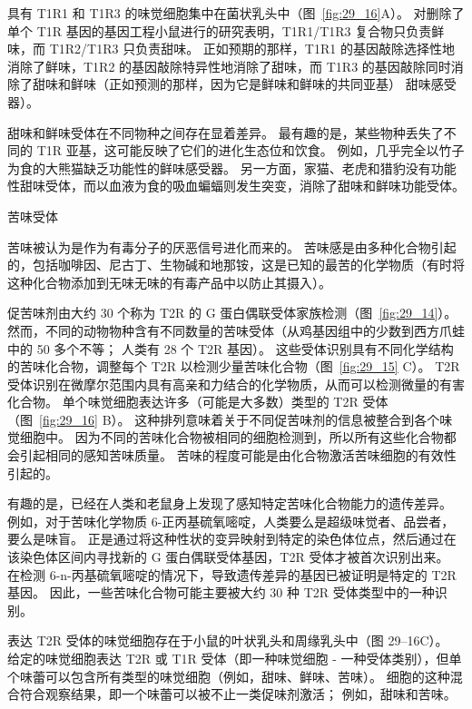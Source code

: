 具有 T1R1 和 T1R3 的味觉细胞集中在菌状乳头中（图~\ref{fig:29_16}A）。
对删除了单个 T1R 基因的基因工程小鼠进行的研究表明，T1R1/T1R3 复合物只负责鲜味，而 T1R2/T1R3 只负责甜味。
正如预期的那样，T1R1 的基因敲除选择性地消除了鲜味，T1R2 的基因敲除特异性地消除了甜味，而 T1R3 的基因敲除同时消除了甜味和鲜味（正如预测的那样，因为它是鲜味和鲜味的共同亚基） 甜味感受器）。


甜味和鲜味受体在不同物种之间存在显着差异。
最有趣的是，某些物种丢失了不同的 T1R 亚基，这可能反映了它们的进化生态位和饮食。
例如，几乎完全以竹子为食的大熊猫缺乏功能性的鲜味感受器。
另一方面，家猫、老虎和猎豹没有功能性甜味受体，而以血液为食的吸血蝙蝠则发生突变，消除了甜味和鲜味功能受体。



苦味受体

苦味被认为是作为有毒分子的厌恶信号进化而来的。
苦味感是由多种化合物引起的，包括咖啡因、尼古丁、生物碱和地那铵，这是已知的最苦的化学物质（有时将这种化合物添加到无味无味的有毒产品中以防止其摄入）。


促苦味剂由大约 30 个称为 T2R 的 G 蛋白偶联受体家族检测（图~\ref{fig:29_14}）。
然而，不同的动物物种含有不同数量的苦味受体（从鸡基因组中的少数到西方爪蛙中的 50 多个不等；
人类有 28 个 T2R 基因）。
这些受体识别具有不同化学结构的苦味化合物，调整每个 T2R 以检测少量苦味化合物（图~\ref{fig:29_15} C）。
T2R 受体识别在微摩尔范围内具有高亲和力结合的化学物质，从而可以检测微量的有害化合物。
单个味觉细胞表达许多（可能是大多数）类型的 T2R 受体（图~\ref{fig:29_16} B）。
这种排列意味着关于不同促苦味剂的信息被整合到各个味觉细胞中。
因为不同的苦味化合物被相同的细胞检测到，所以所有这些化合物都会引起相同的感知苦味质量。
苦味的程度可能是由化合物激活苦味细胞的有效性引起的。


有趣的是，已经在人类和老鼠身上发现了感知特定苦味化合物能力的遗传差异。
例如，对于苦味化学物质 6-正丙基硫氧嘧啶，人类要么是超级味觉者、品尝者，要么是味盲。
正是通过将这种性状的变异映射到特定的染色体位点，然后通过在该染色体区间内寻找新的 G 蛋白偶联受体基因，T2R 受体才被首次识别出来。
在检测 6-n-丙基硫氧嘧啶的情况下，导致遗传差异的基因已被证明是特定的 T2R 基因。
因此，一些苦味化合物可能主要被大约 30 种 T2R 受体类型中的一种识别。


表达 T2R 受体的味觉细胞存在于小鼠的叶状乳头和周缘乳头中（图 29–16C）。
给定的味觉细胞表达 T2R 或 T1R 受体（即一种味觉细胞 - 一种受体类别），但单个味蕾可以包含所有类型的味觉细胞（例如，甜味、鲜味、苦味）。
细胞的这种混合符合观察结果，即一个味蕾可以被不止一类促味剂激活； 例如，甜味和苦味。



